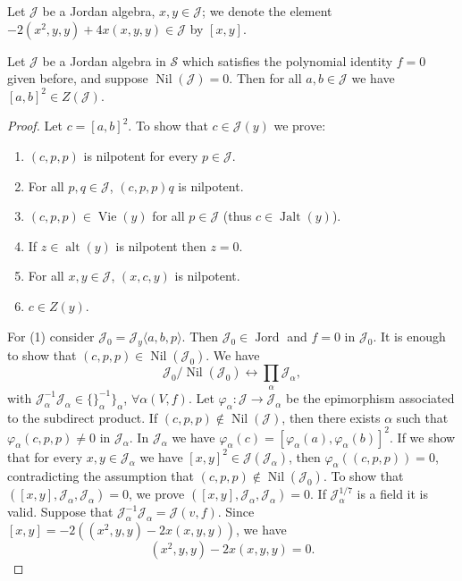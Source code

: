 \documentclass{article}
\begin{document}
Let $\mathcal{J}$ be a Jordan algebra, $x,y \in \mathcal{J}$; we denote the element $-2(x^2,y,y)+4x(x,y,y) \in \mathcal{J}$ by $[x,y]$.

\begin{lemma}
Let $\mathcal{J}$ be a Jordan algebra in $\mathcal{S}$ which satisfies the polynomial identity $f=0$ given before, and suppose $\operatorname{Nil}(\mathcal{J})=0$. Then for all $a,b \in \mathcal{J}$ we have $[a,b]^2 \in Z(\mathcal{J})$.
\end{lemma}

\begin{proof}
Let $c=[a,b]^2$. To show that $c \in \mathcal{J}(y)$ we prove:
\begin{enumerate}
    \item $(c,p,p)$ is nilpotent for every $p \in \mathcal{J}$.
    \item For all $p,q \in \mathcal{J}$, $(c,p,p)q$ is nilpotent.
    \item $(c,p,p) \in \operatorname{Vie}(y)$ for all $p \in \mathcal{J}$ (thus $c \in \operatorname{Jalt}(y)$).
    \item If $z \in \operatorname{alt}(y)$ is nilpotent then $z=0$.
    \item For all $x,y \in \mathcal{J}$, $(x,c,y)$ is nilpotent.
    \item $c \in Z(y)$.
\end{enumerate}
For (1) consider $\mathcal{J}_0 = \mathcal{J}_y\langle a,b,p\rangle$. Then $\mathcal{J}_0 \in \operatorname{Jord}$ and $f=0$ in $\mathcal{J}_0$. It is enough to show that $(c,p,p) \in \operatorname{Nil}(\mathcal{J}_0)$. We have
\[
\mathcal{J}_0/\operatorname{Nil}(\mathcal{J}_0) \longleftrightarrow \prod_\alpha \mathcal{J}_\alpha,
\]
with $\mathcal{J}_\alpha^{-1}\mathcal{J}_\alpha \in \{ \}_\alpha^{-1}\}_\alpha$, $\forall \alpha (V,f)$. Let $\varphi_\alpha: \mathcal{J} \to \mathcal{J}_\alpha$ be the epimorphism associated to the subdirect product. If $(c,p,p) \notin \operatorname{Nil}(\mathcal{J})$, then there exists $\alpha$ such that $\varphi_\alpha(c,p,p) \neq 0$ in $\mathcal{J}_\alpha$. In $\mathcal{J}_\alpha$ we have $\varphi_\alpha(c)=[\varphi_\alpha(a),\varphi_\alpha(b)]^2$. If we show that for every $x,y \in \mathcal{J}_\alpha$ we have $[x,y]^2 \in \mathcal{J}(\mathcal{J}_\alpha)$, then $\varphi_\alpha((c,p,p))=0$, contradicting the assumption that $(c,p,p) \notin \operatorname{Nil}(\mathcal{J}_0)$. To show that $([x,y],\mathcal{J}_\alpha,\mathcal{J}_\alpha)=0$, we prove $([x,y],\mathcal{J}_\alpha,\mathcal{J}_\alpha)=0$. If $\mathcal{J}_\alpha^{1/7}$ is a field it is valid. Suppose that $\mathcal{J}_\alpha^{-1}\mathcal{J}_\alpha = \mathcal{J}(v,f)$. Since $[x,y]=-2((x^2,y,y)-2x(x,y,y))$, we have
\[
(x^2,y,y)-2x(x,y,y)=0.
\]
\end{proof}
\end{document}
